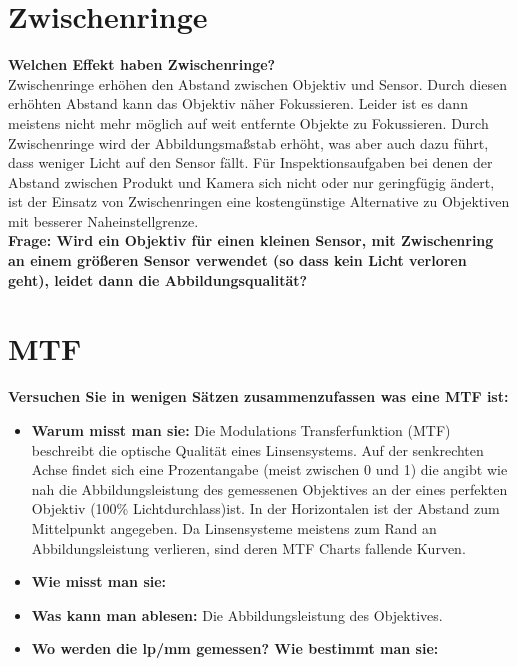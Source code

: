 \documentclass[a4paper]{article}
\begin{document}
	\newpage
	
	\section{Zwischenringe}
	\textbf{Welchen Effekt haben Zwischenringe?}\\
	Zwischenringe erhöhen den Abstand zwischen Objektiv und Sensor. Durch diesen erhöhten Abstand kann das Objektiv näher Fokussieren. Leider ist es dann meistens nicht mehr möglich auf weit entfernte Objekte zu Fokussieren. Durch Zwischenringe wird der Abbildungsmaßstab erhöht, was aber auch dazu führt, dass weniger Licht auf den Sensor fällt. Für Inspektionsaufgaben bei denen der Abstand zwischen Produkt und Kamera sich nicht oder nur geringfügig ändert, ist der Einsatz von Zwischenringen eine kostengünstige Alternative zu Objektiven mit besserer Naheinstellgrenze.\\
	\textbf{Frage: Wird ein Objektiv für einen kleinen Sensor, mit Zwischenring an einem größeren Sensor verwendet (so dass kein Licht verloren geht), leidet dann die Abbildungsqualität?}\\
	
	\section{MTF}
	\textbf{Versuchen Sie in wenigen Sätzen zusammenzufassen was eine MTF ist:}\\
	\begin{itemize}
		\item \textbf{Warum misst man sie:} Die Modulations Transferfunktion (MTF) beschreibt die optische Qualität eines Linsensystems. Auf der senkrechten Achse findet sich eine Prozentangabe (meist zwischen 0 und 1) die angibt wie nah die Abbildungsleistung des gemessenen Objektives an der eines perfekten Objektiv (100\% Lichtdurchlass)ist.
		In der Horizontalen ist der Abstand zum Mittelpunkt angegeben. Da Linsensysteme meistens zum Rand an Abbildungsleistung verlieren, sind deren MTF Charts fallende Kurven.\\
		\item \textbf{Wie misst man sie:} \\
		\item \textbf{Was kann man ablesen:} Die Abbildungsleistung des Objektives.\\
		\item \textbf{Wo werden die lp/mm gemessen? Wie bestimmt man sie:} \\
	\end{itemize}
	
\end{document}
